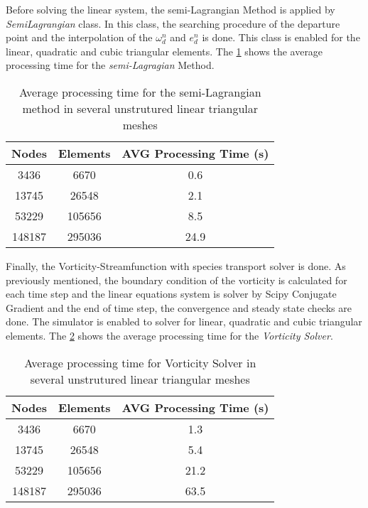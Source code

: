 \medskip
Before solving the linear system, the semi-Lagrangian Method is applied
by \textit{SemiLagrangian} class. In this class, the searching procedure
of the departure point and 
the interpolation of the $\omega_{d}^{n}$ and $e_{d}^{n}$ is done.
This class is enabled for the linear, quadratic and cubic triangular
elements.
The \ref{tempo semi lagrangian} 
shows the average processing time for the \textit{semi-Lagragian} Method.

\vspace{0.5cm}
\begin{table}[H]
\centering
\begin{tabular}{ccc}
\toprule
\textbf{Nodes} & \textbf{Elements} & \textbf{AVG Processing Time} (s) \\
\midrule
3436 & 6670 & 0.6 \\
13745 & 26548 & 2.1 \\
53229 & 105656 & 8.5 \\
148187 & 295036 & 24.9 \\



\bottomrule
\end{tabular}
\caption{Average processing time for the semi-Lagrangian method in several unstrutured linear triangular meshes}
\label{tempo semi lagrangian}
\end{table}




\medskip
Finally, the Vorticity-Streamfunction with species transport solver 
is done.  
As previously mentioned, the boundary condition of the vorticity
is calculated for each time step and 
the linear equations system is solver by Scipy Conjugate Gradient
and the end of time step, 
the convergence and steady state checks are done.
The simulator is enabled to solver for linear, quadratic and cubic
triangular elements. The \ref{tempo vorticity solver} 
shows the average processing time for the \textit{Vorticity Solver}.

\vspace{0.5cm}
\begin{table}[H]
\centering
\begin{tabular}{ccc}
\toprule
\textbf{Nodes} & \textbf{Elements} & \textbf{AVG Processing Time} (s) \\
\midrule
3436 & 6670 & 1.3 \\
13745 & 26548 & 5.4 \\
53229 & 105656 & 21.2 \\
148187 & 295036 & 63.5 \\



\bottomrule
\end{tabular}
\caption{Average processing time for Vorticity Solver in several unstrutured linear triangular meshes}
\label{tempo vorticity solver}
\end{table}



